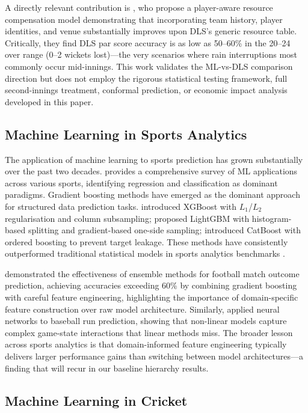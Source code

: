\documentclass[10pt,a4paper,twocolumn]{article}
\begin{document}
A directly relevant contribution is \citet{zia2022player}, who propose a player-aware resource compensation model demonstrating that incorporating team history, player identities, and venue substantially improves upon DLS's generic resource table. Critically, they find DLS par score accuracy is as low as 50--60\% in the 20--24 over range (0--2 wickets lost)---the very scenarios where rain interruptions most commonly occur mid-innings. This work validates the ML-vs-DLS comparison direction but does not employ the rigorous statistical testing framework, full second-innings treatment, conformal prediction, or economic impact analysis developed in this paper.

\subsection{Machine Learning in Sports Analytics}

The application of machine learning to sports prediction has grown substantially over the past two decades. \citet{bunker2019machine} provides a comprehensive survey of ML applications across various sports, identifying regression and classification as dominant paradigms. Gradient boosting methods have emerged as the dominant approach for structured data prediction tasks. \citet{chen2016xgboost} introduced XGBoost with $L_1$/$L_2$ regularisation and column subsampling; \citet{ke2017lightgbm} proposed LightGBM with histogram-based splitting and gradient-based one-side sampling; \citet{prokhorenkova2018catboost} introduced CatBoost with ordered boosting to prevent target leakage. These methods have consistently outperformed traditional statistical models in sports analytics benchmarks \citep{bunker2019machine}.

\citet{baboota2019predictive} demonstrated the effectiveness of ensemble methods for football match outcome prediction, achieving accuracies exceeding 60\% by combining gradient boosting with careful feature engineering, highlighting the importance of domain-specific feature construction over raw model architecture. Similarly, \citet{huang2010neural} applied neural networks to baseball run prediction, showing that non-linear models capture complex game-state interactions that linear methods miss. The broader lesson across sports analytics is that domain-informed feature engineering typically delivers larger performance gains than switching between model architectures---a finding that will recur in our baseline hierarchy results.

\subsection{Machine Learning in Cricket}
\end{document}
